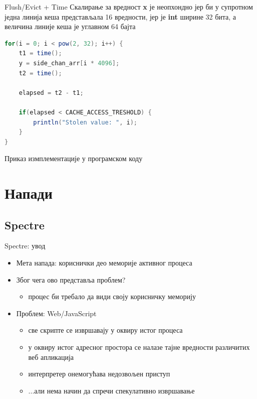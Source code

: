 \documentclass[xcolor=table]{beamer}
\begin{document}
\begin{frame}{Flush/Evict + Time}
        Скалирање за вредност \textbf{x} је неопхондно јер би у супротном једна линија кеша представљала 16 вредности, јер је \textbf{int} ширине 32 бита,
        а величина линије кеша је углавном 64 бајта
        
        \framebreak
        
        \begin{lstlisting}[language=java,frame=single]
for(i = 0; i < pow(2, 32); i++) {
    t1 = time();
    y = side_chan_arr[i * 4096];
    t2 = time();
    
    elapsed = t2 - t1;
    
    if(elapsed < CACHE_ACCESS_TRESHOLD) {
        println("Stolen value: ", i);
    }
}
        \end{lstlisting}
        
        Приказ измплементације у програмском коду 
    \end{frame}
    
    \section{Напади}
    \subsection{Spectre}
    
    \begin{frame}{Spectre: увод}
        \begin{itemize}
            \item Мета напада: кориснички део меморије активног процеса
            \item Због чега ово представља проблем?
            \begin{itemize}
                \item процес би требало да види своју корисничку меморију
            \end{itemize}
            \item Проблем: Web/JavaScript
            \begin{itemize}
                \item све скрипте се извршавају у оквиру истог процеса
                \item у оквиру истог адресног простора се налазе тајне вредности различитих веб апликација
                \item интерпретер онемогућава недозвољен приступ
                \item ...али нема начин да спречи спекулативно извршавање
            \end{itemize}
        \end{itemize}
    \end{frame}
        
\end{document}
